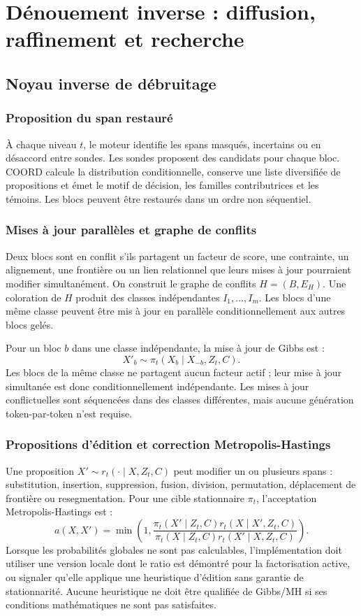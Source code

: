 \documentclass[11pt,a4paper,oneside]{report}
\begin{document}
\part{Dénouement inverse : diffusion, raffinement et recherche}
\chapter{Noyau inverse de débruitage}
\section{Proposition du span restauré}
À chaque niveau $t$, le moteur identifie les spans masqués, incertains ou en désaccord entre sondes. Les sondes proposent des candidats pour chaque bloc. COORD calcule la distribution conditionnelle, conserve une liste diversifiée de propositions et émet le motif de décision, les familles contributrices et les témoins. Les blocs peuvent être restaurés dans un ordre non séquentiel.

\section{Mises à jour parallèles et graphe de conflits}
Deux blocs sont en conflit s'ils partagent un facteur de score, une contrainte, un alignement, une frontière ou un lien relationnel que leurs mises à jour pourraient modifier simultanément. On construit le graphe de conflits $H=(B,E_H)$. Une coloration de $H$ produit des classes indépendantes $I_1,\ldots,I_m$. Les blocs d'une même classe peuvent être mis à jour en parallèle conditionnellement aux autres blocs gelés.

Pour un bloc $b$ dans une classe indépendante, la mise à jour de Gibbs est :
\[
X'_b\sim\pi_t(X_b\mid X_{-b},Z_t,C).
\]
Les blocs de la même classe ne partagent aucun facteur actif ; leur mise à jour simultanée est donc conditionnellement indépendante. Les mises à jour conflictuelles sont séquencées dans des classes différentes, mais aucune génération token-par-token n'est requise.

\section{Propositions d'édition et correction Metropolis-Hastings}
Une proposition $X'\sim r_t(\cdot\mid X,Z_t,C)$ peut modifier un ou plusieurs spans : substitution, insertion, suppression, fusion, division, permutation, déplacement de frontière ou resegmentation. Pour une cible stationnaire $\pi_t$, l'acceptation Metropolis-Hastings est :
\[
a(X,X')=\min\left(1,
\frac{\pi_t(X'\mid Z_t,C)r_t(X\mid X',Z_t,C)}
{\pi_t(X\mid Z_t,C)r_t(X'\mid X,Z_t,C)}\right).
\]
Lorsque les probabilités globales ne sont pas calculables, l'implémentation doit utiliser une version locale dont le ratio est démontré pour la factorisation active, ou signaler qu'elle applique une heuristique d'édition sans garantie de stationnarité. Aucune heuristique ne doit être qualifiée de Gibbs/MH si ses conditions mathématiques ne sont pas satisfaites.
\end{document}
